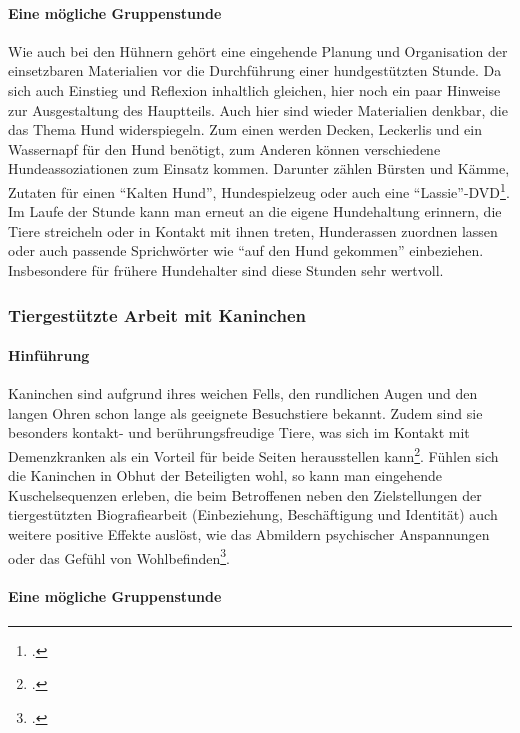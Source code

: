\paragraph{Eine mögliche Gruppenstunde}
\label{sec:k4.3.2.2_EineMöglicheGruppenstunde}

Wie auch bei den Hühnern gehört eine eingehende Planung und Organisation der einsetzbaren Materialien vor die Durchführung einer hundgestützten Stunde. Da sich auch Einstieg und Reflexion inhaltlich gleichen, hier noch ein paar Hinweise zur Ausgestaltung des Hauptteils. Auch hier sind wieder Materialien denkbar, die das Thema Hund widerspiegeln. Zum einen werden Decken, Leckerlis und ein Wassernapf für den Hund benötigt, zum Anderen können verschiedene Hundeassoziationen zum Einsatz kommen. Darunter zählen Bürsten und Kämme, Zutaten für einen "`Kalten Hund"', Hundespielzeug oder auch eine "`Lassie"'-DVD\footcite[106-111]{Giruc2011}. Im Laufe der Stunde kann man erneut an die eigene Hundehaltung erinnern, die Tiere streicheln oder in Kontakt mit ihnen treten, Hunderassen zuordnen lassen oder auch passende Sprichwörter wie "`auf den Hund gekommen"' einbeziehen. Insbesondere für frühere Hundehalter sind diese Stunden sehr wertvoll.

\subsubsection{Tiergestützte Arbeit mit Kaninchen}
\label{sec:k4.3.3_TiergestützteArbeitMitKaninchen}

\paragraph{Hinführung}
\label{sec:k4.3.3.1_Hinfuehrung}

Kaninchen sind aufgrund ihres weichen Fells, den rundlichen Augen und den langen Ohren schon lange als geeignete Besuchstiere bekannt. Zudem sind sie besonders kontakt- und berührungsfreudige Tiere, was sich im Kontakt mit Demenzkranken als ein Vorteil für beide Seiten herausstellen kann\footcite[40]{Giruc2011}. Fühlen sich die Kaninchen in Obhut der Beteiligten wohl, so kann man eingehende Kuschelsequenzen erleben, die beim Betroffenen neben den Zielstellungen der tiergestützten Biografiearbeit (Einbeziehung, Beschäftigung und Identität) auch weitere positive Effekte auslöst, wie das Abmildern psychischer Anspannungen oder das Gefühl von Wohlbefinden\footcite[74]{Leder2006}.

\paragraph{Eine mögliche Gruppenstunde}
\label{sec:k4.3.3.2_EineMöglicheGruppenstunde}

